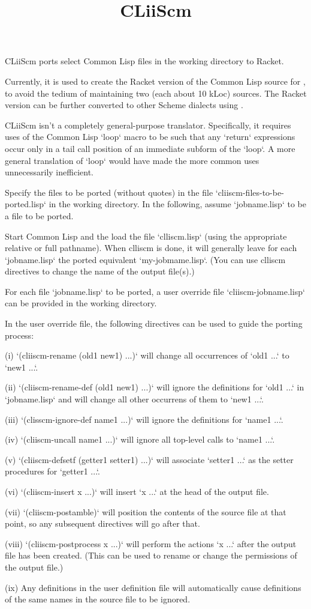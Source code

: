 
\title{CLiiScm}

CLiiScm ports select Common Lisp files in the working
directory to Racket. 

Currently, it is used to create the Racket version of the Common
Lisp source for
, to avoid the
tedium of maintaining two (each about 10 kLoc) sources. The Racket
version can be further converted to other Scheme dialects using
. 

CLiiScm isn't a completely general-purpose translator.
Specifically, it requires uses of the Common Lisp `loop` macro to
be such that any `return` expressions occur only in a tail call
position of an immediate subform of the `loop`. A more general
translation of `loop` would have made the more common uses
unnecessarily inefficient.

Specify the files to be ported (without quotes) in the file
`cliiscm-files-to-be-ported.lisp` in the working directory.  In
the following, assume `jobname.lisp` to be a file to be ported.

Start Common Lisp and the load the file `clliscm.lisp` (using the
appropriate relative or full pathname). When clliscm is done, it
will  generally leave for each `jobname.lisp` the ported
equivalent `my-jobmame.lisp`. (You can use clliscm directives to
change the name of the output file(s).)

For each file `jobname.lisp` to be ported, a user override file
`cliiscm-jobname.lisp` can be provided in the working directory.

In the user override file, the following directives can be used
to guide the porting process:

(i) `(cliiscm-rename (old1 new1) ...)` will change all
occurrences of `old1 ...` to `new1 ...`.

(ii) `(cliiscm-rename-def (old1 new1) ...)` will ignore the
definitions for `old1 ...` in `jobname.lisp` and will change all
other occurrens of them to `new1 ...`.

(iii) `(clisscm-ignore-def name1 ...)` will ignore the
definitions for `name1 ...`.

(iv) `(cliiscm-uncall name1 ...)` will ignore all top-level calls
to `name1 ...`.

(v) `(cliiscm-defsetf (getter1 setter1) ...)` will associate
`setter1 ...` as the setter procedures for `getter1 ...`.

(vi) `(cliiscm-insert x ...)` will insert `x ...` at the head of
the output file.

(vii) `(cliiscm-postamble)` will position the contents of the
source file at that point, so any subsequent directives will go
after that.

(viii) `(cliiscm-postprocess x ...)` will perform the actions `x
...` after the output file has been created. (This can be used
to rename or change the permissions of the output file.)

(ix) Any definitions in the user definition file will
automatically cause definitions of the same names in the source
file to be ignored.

\bye
